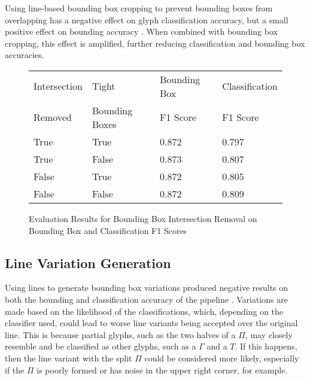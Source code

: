Using line-based bounding box cropping to prevent bounding boxes from overlapping has a negative effect on glyph classification accuracy, but a small positive effect on bounding accuracy . When combined with bounding box cropping, this effect is amplified, further reducing classification and bounding box accuracies.

\begin{figure}[H]
    \caption{Evaluation Results for Bounding Box Intersection Removal on Bounding Box and Classification F1 Scores}
    \label{fig:lineIntersect}
    \begin{center}
      \begin{tabular}{ | l | l | l | l | }
          \hline
          Intersection & Tight & Bounding Box & Classification \\
          Removed & Bounding Boxes & F1 Score & F1 Score \\
          \hline
          True & True & 0.872	& 0.797 \\
          True & False & 0.873 & 0.807 \\
          False & True & 0.872 & 0.805 \\
          False & False & 0.872	& 0.809 \\
          \hline
      \end{tabular}
    \end{center}
\end{figure}

\subsection{Line Variation Generation}

Using lines to generate bounding box variations produced negative results on both the bounding and classification accuracy of the pipeline . Variations are made based on the likelihood of the classifications, which, depending on the classifier used, could lead to worse line variants being accepted over the original line. This is because partial glyphs, such as the two halves of a $\Pi$, may closely resemble and be classified as other glyphs, such as a $\Gamma$ and a $T$. If this happens, then the line variant with the split $\Pi$ could be considered more likely, especially if the $\Pi$ is poorly formed or has noise in the upper right corner, for example.

